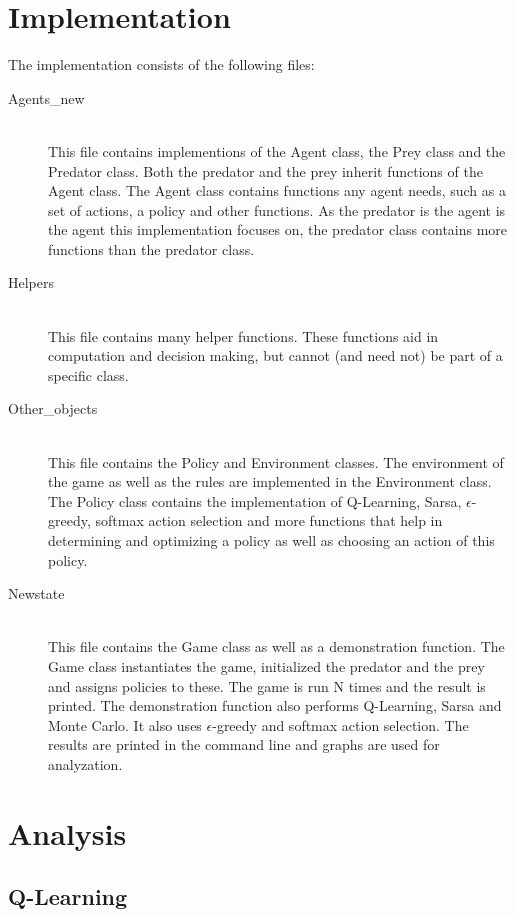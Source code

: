 \documentclass{article}
\begin{document}
\section*{Implementation}
The implementation consists of the following files:
\begin{description}
	\item[Agents\_new] \hfill \\ 
	This file contains implementions of the Agent class, the Prey class and the Predator class. Both the predator and the prey inherit functions of the Agent class. The Agent class contains functions any agent needs, such as a set of actions, a policy and other functions. As the predator is the agent is the agent this implementation focuses on, the predator class contains more functions than the predator class.
	
	\item[Helpers] \hfill \\ 
	This file contains many helper functions. These functions aid in computation and decision making, but cannot (and need not) be part of a specific class.
	
	\item[Other\_objects] \hfill \\ %
	This file contains the Policy and Environment classes. The environment of the game as well as the rules are implemented in the Environment class. The Policy class contains the implementation of Q-Learning, Sarsa, $\epsilon$-greedy, softmax action selection and more functions that help in determining and optimizing a policy as well as choosing an action of this policy.
	\item[Newstate] \hfill \\ 
	This file contains the Game class as well as a demonstration function. The Game class instantiates the game, initialized the predator and the prey and assigns policies to these. The game is run N times and the result is printed. The demonstration function also performs Q-Learning, Sarsa and Monte Carlo. It also uses $\epsilon$-greedy and softmax action selection. The results are printed in the command line and graphs are used for analyzation.
\end{description}
\section*{Analysis}

\subsection*{Q-Learning}
\end{document}
